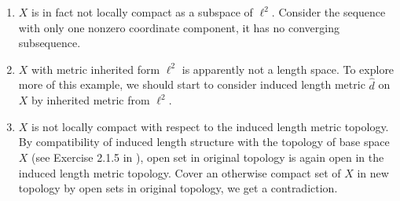 \begin{rmk}
	\begin{enumerate}
		\item $X$ is in fact not locally compact as a subspace of $\ell^2$. Consider the sequence with only one nonzero coordinate component, it has no converging subsequence.
		\item $X$ with metric inherited form $\ell^2$ is apparently not a length space. To explore more of this example, we should start to consider induced length metric $\hat{d}$ on $X$ by inherited metric from $\ell^2$.
		\item $X$ is not locally compact with respect to the induced length metric topology. By compatibility of induced length structure with the topology of base space $X$ (see Exercise 2.1.5 in \cite{burago2001course}), open set in original topology is again open in the induced length metric topology. Cover an otherwise compact set of $X$ in new topology by open sets in original topology, we get a contradiction.

	\end{enumerate}
\end{rmk}


